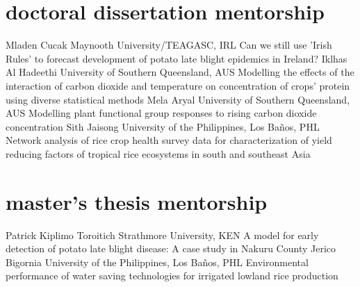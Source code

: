 \section*{doctoral dissertation mentorship}
\begin{entrylist}
    {Mladen Cucak {}}
    {Maynooth University/TEAGASC, IRL}
    {Can we still use 'Irish Rules' to forecast development of potato late blight epidemics in Ireland?}
    {Iklhas Al Hadeethi {}}
    {University of Southern Queensland, AUS}
    {Modelling the effects of the interaction of carbon dioxide and temperature on concentration of crops' protein using diverse statistical methods}
    {Mela Aryal {}}
    {University of Southern Queensland, AUS}
    {Modelling plant functional group responses to rising carbon dioxide concentration}
    {Sith Jaisong {}}
    {University of the Philippines, Los Ba\~nos, PHL}
    {Network analysis of rice crop health survey data for characterization of yield reducing factors of tropical rice ecosystems in south and southeast Asia}
\end{entrylist}

\section*{master's thesis mentorship}
\begin{entrylist}
    {Patrick Kiplimo Toroitich {}}
    {Strathmore University, KEN}
    {A model for early detection of potato late blight disease: A case study in Nakuru County}
    {Jerico Bigornia {}}
    {University of the Philippines, Los Ba\~nos, PHL}
    {Environmental performance of water saving technologies for irrigated lowland rice production}
\end{entrylist}
